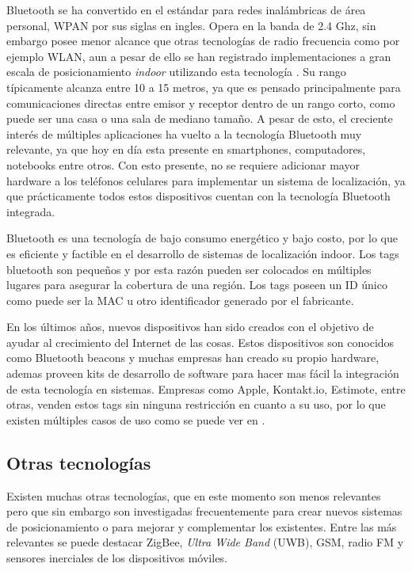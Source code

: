 Bluetooth se ha convertido en el estándar para redes inalámbricas de área personal, WPAN por sus siglas en ingles. Opera en la banda de 2.4 Ghz, sin embargo posee menor alcance que otras tecnologías de radio frecuencia como por ejemplo WLAN, aun a pesar de ello se han registrado implementaciones a gran escala de posicionamiento \textit{indoor} utilizando esta tecnología \citep{BT}. Su rango típicamente alcanza entre 10 a 15 metros, ya que es pensado principalmente para comunicaciones directas entre emisor y receptor dentro de un rango corto, como puede ser una casa o una sala de mediano tamaño. A pesar de esto, el creciente interés de múltiples aplicaciones ha vuelto a la tecnología Bluetooth muy relevante, ya que hoy en día esta presente en smartphones, computadores, notebooks entre otros. Con esto presente, no se requiere adicionar mayor hardware a los teléfonos celulares para implementar un sistema de localización, ya que prácticamente todos estos dispositivos cuentan con la tecnología Bluetooth integrada.

Bluetooth es una tecnología de bajo consumo energético y bajo costo, por lo que es eficiente y factible en el desarrollo de sistemas de localización indoor. Los tags bluetooth son pequeños y por esta razón pueden ser colocados en múltiples lugares para asegurar la cobertura de una región. Los tags poseen un ID único como puede ser la MAC u otro identificador generado por el fabricante.

En los últimos años, nuevos dispositivos han sido creados con el objetivo de ayudar al crecimiento del Internet de las cosas. Estos dispositivos son conocidos como Bluetooth beacons y muchas empresas han creado su propio hardware, ademas proveen kits de desarrollo de software para hacer mas fácil la integración de esta tecnología en sistemas. Empresas como Apple, Kontakt.io, Estimote, entre otras, venden estos tags sin ninguna restricción en cuanto a su uso, por lo que existen múltiples casos de uso como se puede ver en \citep{kontaktio}.

\subsection{Otras tecnologías}

Existen muchas otras tecnologías, que en este momento son menos relevantes pero que sin embargo son investigadas frecuentemente para crear nuevos sistemas de posicionamiento o para mejorar y complementar los existentes. Entre las más relevantes se puede destacar ZigBee, \textit{Ultra Wide Band} (UWB), GSM, radio FM y sensores inerciales de los dispositivos móviles.

